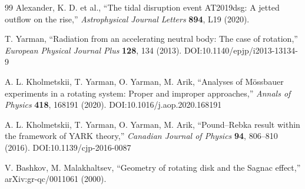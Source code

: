 \documentclass[12pt,a4paper]{article}
\begin{document}
\begin{thebibliography}{99}
		Alexander, K. D. et al., ``The tidal disruption event AT2019dsg: A jetted outflow on the rise,'' \emph{Astrophysical Journal Letters} \textbf{894}, L19 (2020).
		
		T. Yarman, ``Radiation from an accelerating neutral body: The case of rotation,'' \emph{European Physical Journal Plus} \textbf{128}, 134 (2013). DOI:10.1140/epjp/i2013-13134-9
		
		A. L. Kholmetskii, T. Yarman, O. Yarman, M. Arik, ``Analyses of Mössbauer experiments in a rotating system: Proper and improper approaches,'' \emph{Annals of Physics} \textbf{418}, 168191 (2020). DOI:10.1016/j.aop.2020.168191
		
		A. L. Kholmetskii, T. Yarman, O. Yarman, M. Arik, ``Pound–Rebka result within the framework of YARK theory,'' \emph{Canadian Journal of Physics} \textbf{94}, 806–810 (2016). DOI:10.1139/cjp-2016-0087
		
		V. Bashkov, M. Malakhaltsev, ``Geometry of rotating disk and the Sagnac effect,'' arXiv:gr-qc/0011061 (2000).
		
	\end{thebibliography}
	
\end{document}
